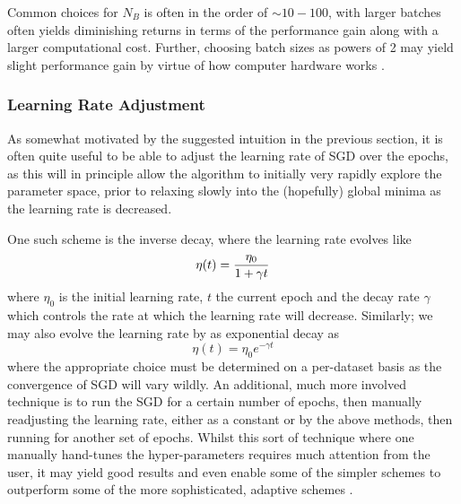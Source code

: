 \documentclass[reprint, english, nofootinbib]{revtex4-2}
\begin{document}
Common choices for $N_B$ is often in the order of $\sim 10-100$, with larger batches often yields diminishing returns in terms of the performance gain along with a larger computational cost. Further, choosing batch sizes as powers of 2 may yield slight performance gain by virtue of how computer hardware works \cite{Aggarwall}.

\subsubsection{Learning Rate Adjustment}
\noindent
As somewhat motivated by the suggested intuition in the previous section, it is often quite useful to be able to adjust the learning rate of SGD over the epochs, as this will in principle allow the algorithm to initially very rapidly explore the parameter space, prior to relaxing slowly into the (hopefully) global minima as the learning rate is decreased.

One such scheme is the inverse decay, where the learning rate evolves like
\begin{equation}
    \eta\qty(t) = \frac{\eta_0}{1 + \gamma t}
\end{equation}
where $\eta_0$ is the initial learning rate, $t$ the current epoch and the decay rate $\gamma$ which controls the rate at which the learning rate will decrease. Similarly; we may also evolve the learning rate by as exponential decay as
\begin{equation}
    \eta(t) = \eta_0 e^{-\gamma t}
\end{equation}
where the appropriate choice must be determined on a per-dataset basis as the convergence of SGD will vary wildly. An additional, much more involved technique is to run the SGD for a certain number of epochs, then manually readjusting the learning rate, either as a constant or by the above methods, then running for another set of epochs. Whilst this sort of technique where one manually hand-tunes the hyper-parameters requires much attention from the user, it may yield good results and even enable some of the simpler schemes to outperform some of the more sophisticated, adaptive schemes \cite{zhang2018yellowfin}.
\end{document}
